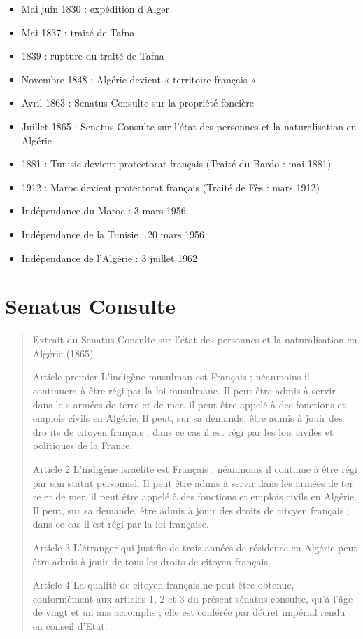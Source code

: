 \begin{itemize}
    \item 
 
Mai
juin 1830 : expédition d’Alger
    \item 
Mai 1837 : traité de Tafna
    \item 
1839 : rupture du traité de Tafna
    \item 
Novembre 1848 : Algérie devient «
territoire français »
    \item 
Avril 1863 :
Senatus Consulte sur la propriété foncière
    \item 
Juillet 1865 :
Senatus Consulte sur l’état des personnes et la naturalisation
en Algérie
    \item 
1881 : Tunisie devient protectorat français (Traité du Bardo : mai 1881)
    \item 
1912 : Maroc devient protectorat français (Traité de Fès : mars 1912)

\item Indépendance du Maroc : 3 mars 1956
\item
Indépendance de la Tunisie : 20 mars 1956
\item
Indépendance de l’Algérie : 3 juillet 1962
\end{itemize}

\section{Senatus Consulte}

\begin{quote}
    Extrait du
Senatus Consulte sur l’état des
personnes et la naturalisation en Algérie (1865)
 
Article premier
L'indigène musulman est Français ; néanmoins il continuera à être régi par la loi musulmane. Il peut être admis à servir dans
le s armées de terre et
de mer. il peut être appelé à des fonctions et emplois civils en Algérie. Il peut, sur sa demande, être admis à jouir des dro its de citoyen français ; dans
ce cas il est régi par les lois civiles et politiques de la France.
 
Article 2
L'indigène
israëlite est Français ; néanmoins il continue à être régi par son statut personnel. Il peut être admis à servir dans les armées de ter re et de
mer. il peut être appelé à des fonctions et emplois civils en Algérie. Il peut, sur sa demande, être admis à jouir des droits de citoyen français ; dans ce
cas il est régi par la loi française.
 
Article 3
L'étranger qui justifie de trois années de résidence en Algérie peut être admis à jouir de tous les droits de citoyen français.
 
Article 4
La qualité de citoyen français ne peut être obtenue, conformément aux articles 1, 2 et 3 du présent sénatus
consulte, qu'à l'âge de vingt et un ans
accomplis ; elle est conférée par décret impérial rendu en conseil d'Etat.
\end{quote}

\in